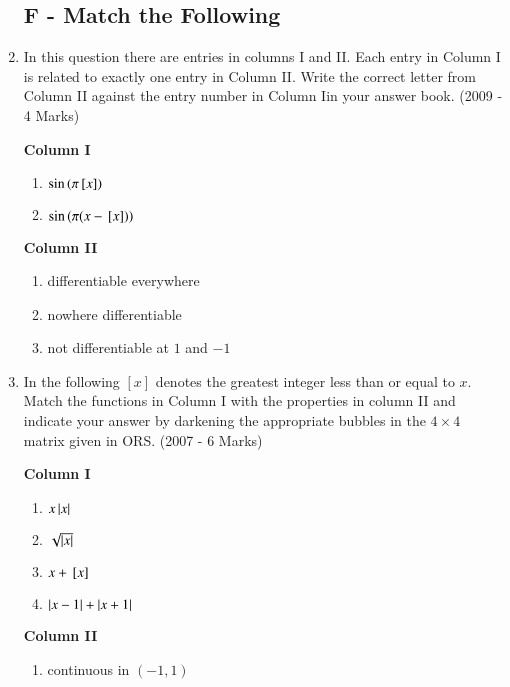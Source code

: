 \documentclass[journal,12pt,twocolumn]{IEEEtran}
\theoremstyle{remark}
\begin{document}
\begin{enumerate}
\subsection*{F - Match the Following}
		 \item In this question there are entries in columns I and II. Each entry in Column I is related to exactly one entry in Column II. Write the correct letter from Column II against the entry number in Column Iin your answer book.      \hfill(2009 - 4 Marks)
			\begin{multicols}{2}
                 \textbf{Column I}
				\begin{enumerate}
					\item	$\sin{(\pi\ensuremath{{}\left[x\right]})}$
					\item $\sin{(\pi(x-\ensuremath{{}\left[x\right]}))}$
				\end{enumerate}
			\columnbreak
                 \textbf{Column II}
				\begin{enumerate}
					\item  differentiable everywhere 
						
					\item  nowhere differentiable

					\item  not differentiable at $1$ and $-1$ 
						
				\end{enumerate}
				\end{multicols}
			\item In the following $[x]$ denotes the greatest integer less than or equal to $ x$. Match the functions in Column I with the properties in column II and indicate your answer by darkening the appropriate bubbles in the $4\times4$ matrix given in ORS.
                  \hfill(2007 - 6 Marks)
			\begin{multicols}{2}
				\textbf{Column I}

				\begin{enumerate}
					\item  $x\left\vert x\right\vert$ 
					\item  $\sqrt{\left\vert x\right\vert}$ 
					\item $x+{}\left[x\right]$ 
					\item  $\left\vert x-1\right\vert+\left\vert x+1\right\vert$
				\end{enumerate}
			\columnbreak
				\textbf{Column II}
				\begin{enumerate}
					\item  continuous in $(-1,1)$


\end{enumerate}
\end{multicols}
\end{enumerate}
\end{document}
